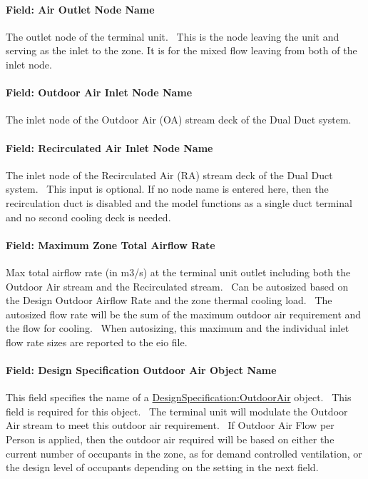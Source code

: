 \paragraph{Field: Air Outlet Node Name}\label{field-air-outlet-node-name-9}

The outlet node of the terminal unit.~ This is the node leaving the unit and serving as the inlet to the zone. It is for the mixed flow leaving from both of the inlet node.

\paragraph{Field: Outdoor Air Inlet Node Name}\label{field-outdoor-air-inlet-node-name}

The inlet node of the Outdoor Air (OA) stream deck of the Dual Duct system.

\paragraph{Field: Recirculated Air Inlet Node Name}\label{field-recirculated-air-inlet-node-name}

The inlet node of the Recirculated Air (RA) stream deck of the Dual Duct system. ~This input is optional. If no node name is entered here, then the recirculation duct is disabled and the model functions as a single duct terminal and no second cooling deck is needed.

\paragraph{Field: Maximum Zone Total Airflow Rate}\label{field-maximum-zone-total-airflow-rate}

Max total airflow rate (in m3/s) at the terminal unit outlet including both the Outdoor Air stream and the Recirculated stream.~ Can be autosized based on the Design Outdoor Airflow Rate and the zone thermal cooling load.~ The autosized flow rate will be the sum of the maximum outdoor air requirement and the flow for cooling. ~When autosizing, this maximum and the individual inlet flow rate sizes are reported to the eio file.

\paragraph{Field: Design Specification Outdoor Air Object Name}\label{field-design-specification-outdoor-air-object-name-3}

This field specifies the name of a \hyperref[designspecificationoutdoorair]{DesignSpecification:OutdoorAir} object.~ This field is required for this object.~ The terminal unit will modulate the Outdoor Air stream to meet this outdoor air requirement.~ If Outdoor Air Flow per Person is applied, then the outdoor air required will be based on either the current number of occupants in the zone, as for demand controlled ventilation, or the design level of occupants depending on the setting in the next field.

